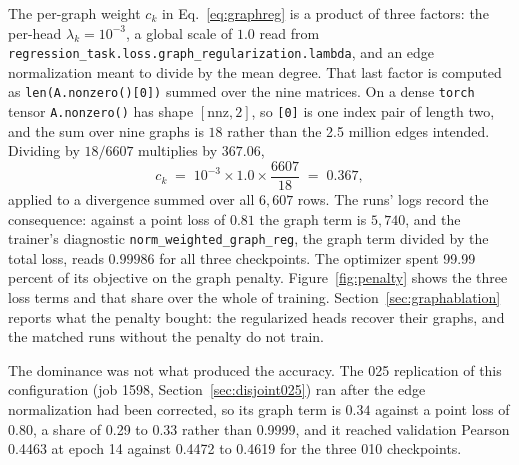 The per-graph weight $c_k$ in Eq.~\ref{eq:graphreg} is a product of three
factors: the per-head $\lambda_k = 10^{-3}$, a global scale of $1.0$ read from
\texttt{regression\_task.loss.graph\_regularization.lambda}, and an edge
normalization meant to divide by the mean degree. That last factor is computed as
\texttt{len(A.nonzero()[0])} summed over the nine matrices. On a dense
\texttt{torch} tensor \texttt{A.nonzero()} has shape $[\mathrm{nnz}, 2]$, so
\texttt{[0]} is one index pair of length two, and the sum over nine graphs is
$18$ rather than the 2.5 million edges intended. Dividing by $18/6607$ multiplies
by $367.06$,
%
\begin{equation}
  c_k \;=\; 10^{-3} \times 1.0 \times \frac{6607}{18} \;=\; 0.367 ,
  \label{eq:effcoef}
\end{equation}
%
applied to a divergence summed over all $6{,}607$ rows. The runs' logs record
the consequence: against a point loss of $0.81$ the graph term is $5{,}740$, and
the trainer's diagnostic \texttt{norm\_weighted\_graph\_reg}, the graph term
divided by the total loss, reads $0.99986$ for all three checkpoints. The
optimizer spent 99.99 percent of its objective on the graph penalty.
Figure~\ref{fig:penalty} shows the three loss terms and that share over the
whole of training. Section~\ref{sec:graphablation} reports what the penalty
bought: the regularized heads recover their graphs, and the matched runs without
the penalty do not train.

The dominance was not what produced the accuracy. The 025 replication of this
configuration (job 1598, Section~\ref{sec:disjoint025}) ran after the edge
normalization had been corrected, so its graph term is $0.34$ against a point
loss of $0.80$, a share of 0.29 to 0.33 rather than 0.9999, and it reached
validation Pearson 0.4463 at epoch 14 against 0.4472 to 0.4619 for the three
010 checkpoints.


